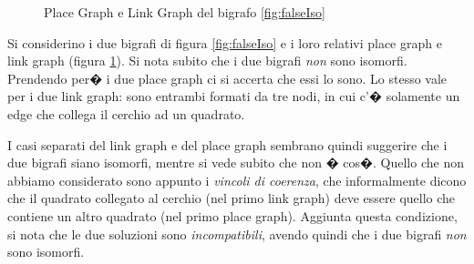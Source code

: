 \begin{figure}[!htbp]
\centering
{}
\hspace{5mm}
\caption{Place Graph e Link Graph del bigrafo \ref{fig:falseIso}\label{fig:falsoIsoDecap}}
\end{figure}

Si considerino i due bigrafi di figura \ref{fig:falseIso} e i loro relativi place graph e link graph (figura \ref{fig:falsoIsoDecap}). Si nota subito che i due bigrafi \emph{non} sono isomorfi. Prendendo per� i due place graph ci si accerta che essi lo sono. Lo stesso vale per i due link graph: sono entrambi formati da tre nodi, in cui c'� solamente un edge che collega il cerchio ad un quadrato.

I casi separati del link graph e del place graph sembrano quindi suggerire che i due bigrafi siano isomorfi, mentre si vede subito che non � cos�. Quello che non abbiamo considerato sono appunto i \emph{vincoli di coerenza}, che informalmente dicono che il quadrato collegato al cerchio (nel primo link graph) deve essere quello che contiene un altro quadrato (nel primo place graph). Aggiunta questa condizione, si nota che le due soluzioni sono \emph{incompatibili}, avendo quindi che i due bigrafi \emph{non} sono isomorfi.






